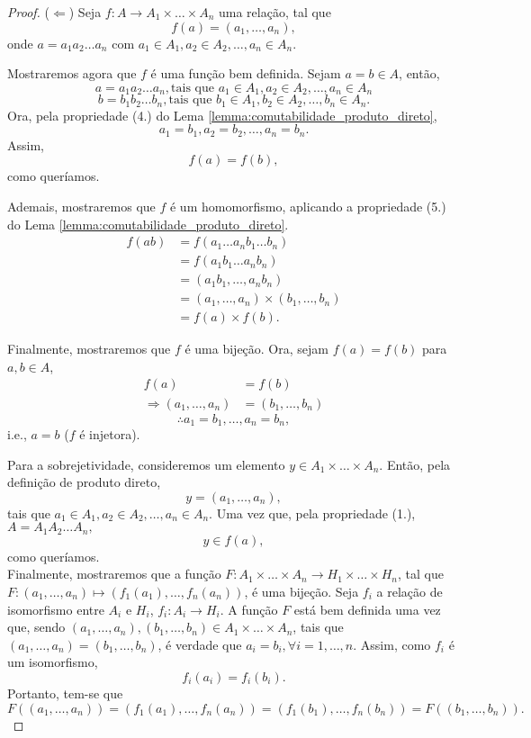 \documentclass[11pt,openany]{book}
\begin{document}
    \begin{proof}
        ($\Leftarrow$) Seja $f: A \rightarrow A_1 \times \dots \times A_n$ uma relação, tal que \[f(a) = (a_1, \dots, a_n),\]
        onde $a = a_1a_2\dots a_n$ com $a_1 \in A_1, a_2 \in A_2, \dots, a_n \in A_n$.
        
        Mostraremos agora que $f$ é uma função bem definida. Sejam $a = b \in A$, então,
        \[a = a_1a_2\dots a_n, \text{tais que $a_1 \in A_1, a_2 \in A_2, \dots, a_n \in A_n$}\]
        \[b = b_1b_2\dots b_n, \text{tais que $b_1 \in A_1, b_2 \in A_2, \dots, b_n \in A_n$}.\]
        Ora, pela propriedade (4.) do Lema \ref{lemma:comutabilidade_produto_direto},
        \[a_1 = b_1, a_2 = b_2, \dots, a_n = b_n.\]
        Assim,
        \[f(a) = f(b),\]
        como queríamos.

        Ademais, mostraremos que $f$ é um homomorfismo, aplicando a propriedade (5.) do Lema \ref{lemma:comutabilidade_produto_direto}.
        \begin{align*}
            f(ab) &= f(a_1\dots a_n b_1\dots b_n)\\
            &= f(a_1b_1\dots a_nb_n)\\
            &= (a_1b_1,\dots, a_nb_n)\\
            &= (a_1,\dots,a_n) \times (b_1,\dots,b_n)\\
            &= f(a) \times f(b).
        \end{align*}

        Finalmente, mostraremos que $f$ é uma bijeção. Ora, sejam $f(a) = f(b)$ para $a,b \in A$,
        \begin{align*}
            f(a) &= f(b)\\
            \Rightarrow(a_1,\dots,a_n) &= (b_1,\dots,b_n)
        \end{align*}
        \[\therefore a_1 = b_1, \dots, a_n = b_n,\]
        i.e., $a = b$ ($f$ é injetora).

        Para a sobrejetividade, consideremos um elemento $y \in A_1 \times \dots \times A_n$. Então, pela definição de produto direto,
        \[y = (a_1, \dots, a_n),\]
        tais que $a_1 \in A_1, a_2 \in A_2, \dots, a_n \in A_n$. Uma vez que, pela propriedade (1.), $A = A_1A_2\dots A_n,$
        \[y \in f(a),\]
        como queríamos.\\

        Finalmente, mostraremos que a função $F: A_1 \times \dots \times A_n \rightarrow H_1 \times \dots \times H_n$, tal que $F:(a_1, \dots, a_n) \mapsto (f_1(a_1), \dots, f_n(a_n))$, é uma bijeção. Seja $f_i$ a relação de isomorfismo entre $A_i$ e $H_i$, $f_i:A_i\rightarrow H_i$. A função $F$ está bem definida uma vez que, sendo $(a_1, \dots, a_n), (b_1, \dots, b_n) \in  A_1 \times \dots \times A_n$, tais que  $(a_1, \dots, a_n) = (b_1, \dots, b_n)$, é verdade que $a_i = b_i, \forall i = 1, \dots, n$. Assim, como $f_i$ é um isomorfismo,
        \[f_i(a_i) = f_i(b_i).\]
        Portanto, tem-se que
        \[F((a_1, \dots, a_n)) = (f_1(a_1), \dots, f_n(a_n)) = (f_1(b_1), \dots, f_n(b_n)) = F((b_1, \dots, b_n)).\]


\end{proof}
\end{document}

